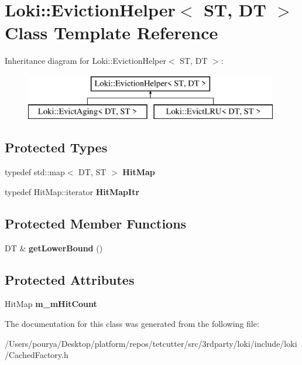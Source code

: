 \hypertarget{classLoki_1_1EvictionHelper}{}\section{Loki\+:\+:Eviction\+Helper$<$ S\+T, D\+T $>$ Class Template Reference}
\label{classLoki_1_1EvictionHelper}
Inheritance diagram for Loki\+:\+:Eviction\+Helper$<$ S\+T, D\+T $>$\+:\begin{figure}[H]
\begin{center}
\leavevmode
\includegraphics[height=2.000000cm]{classLoki_1_1EvictionHelper}
\end{center}
\end{figure}
\subsection*{Protected Types}
\begin{DoxyCompactItemize}
\item 
\hypertarget{classLoki_1_1EvictionHelper_abe1d96686b9e0bd2622b43131a915b23}{}typedef std\+::map$<$ D\+T, S\+T $>$ {\bfseries Hit\+Map}\label{classLoki_1_1EvictionHelper_abe1d96686b9e0bd2622b43131a915b23}

\item 
\hypertarget{classLoki_1_1EvictionHelper_a72ffc3d39b0700bd812102de11ae8c63}{}typedef Hit\+Map\+::iterator {\bfseries Hit\+Map\+Itr}\label{classLoki_1_1EvictionHelper_a72ffc3d39b0700bd812102de11ae8c63}

\end{DoxyCompactItemize}
\subsection*{Protected Member Functions}
\begin{DoxyCompactItemize}
\item 
\hypertarget{classLoki_1_1EvictionHelper_adfe95d3f4c721e4e4beb427c10de4997}{}D\+T \& {\bfseries get\+Lower\+Bound} ()\label{classLoki_1_1EvictionHelper_adfe95d3f4c721e4e4beb427c10de4997}

\end{DoxyCompactItemize}
\subsection*{Protected Attributes}
\begin{DoxyCompactItemize}
\item 
\hypertarget{classLoki_1_1EvictionHelper_ae9d643e6c2b125392236f5496ee0a198}{}Hit\+Map {\bfseries m\+\_\+m\+Hit\+Count}\label{classLoki_1_1EvictionHelper_ae9d643e6c2b125392236f5496ee0a198}

\end{DoxyCompactItemize}


The documentation for this class was generated from the following file\+:\begin{DoxyCompactItemize}
\item 
/\+Users/pourya/\+Desktop/platform/repos/tetcutter/src/3rdparty/loki/include/loki/Cached\+Factory.\+h\end{DoxyCompactItemize}
